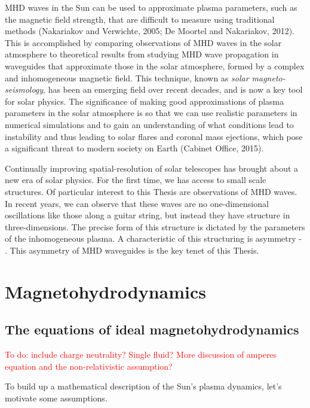 \documentclass[12pt]{../style-files/ociamthesis}
\begin{document}
MHD waves in the Sun can be used to approximate plasma parameters, such as the magnetic field strength, that are difficult to measure using traditional methods (Nakariakov and Verwichte, 2005; De Moortel and Nakariakov, 2012). This is accomplished by comparing observations of MHD waves in the solar atmosphere to theoretical results from studying MHD wave propagation in waveguides that approximate those in the solar atmosphere, formed by a complex and inhomogeneous magnetic field. This technique, known as \textit{solar magneto-seismology}, has been an emerging field over recent decades, and is now a key tool for solar physics. The significance of making good approximations of plasma parameters in the solar atmosphere is so that we can use realistic parameters in numerical simulations and to gain an understanding of what conditions lead to instability and thus leading to solar flares and coronal mass ejections, which pose a significant threat to modern society on Earth (Cabinet Office, 2015).

Continually improving spatial-resolution of solar telescopes has brought about a new era of solar physics. For the first time, we has access to small scale structures. Of particular interest to this Thesis are observations of MHD waves. In recent years, we can observe that these waves are no one-dimensional oscillations like those along a guitar string, but instead they have structure in three-dimensions. The precise form of this structure is dictated by the parameters of the inhomogeneous plasma. A characteristic of this structuring is asymmetry - . This asymmetry of MHD waveguides is the key tenet of this Thesis.


\section{Magnetohydrodynamics}
\label{sec: MHD}

\subsection{The equations of ideal magnetohydrodynamics} \label{sec: MHD eqns}

\textcolor{red}{To do: include charge neutrality? Single fluid? More discussion of amperes equation and the non-relativistic assumption?}

To build up a mathematical description of the Sun's plasma dynamics, let's motivate some assumptions.
\end{document}
